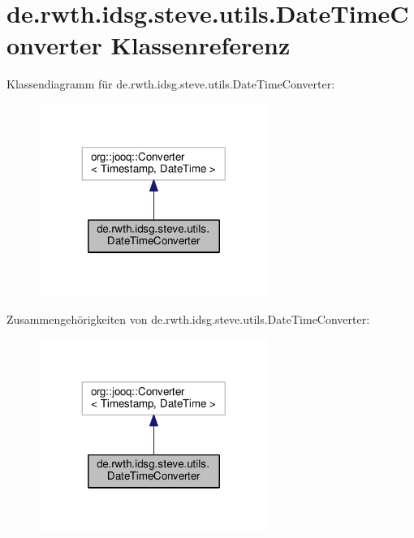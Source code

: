 \hypertarget{classde_1_1rwth_1_1idsg_1_1steve_1_1utils_1_1_date_time_converter}{\section{de.\+rwth.\+idsg.\+steve.\+utils.\+Date\+Time\+Converter Klassenreferenz}
\label{classde_1_1rwth_1_1idsg_1_1steve_1_1utils_1_1_date_time_converter}
}


Klassendiagramm für de.\+rwth.\+idsg.\+steve.\+utils.\+Date\+Time\+Converter\+:\nopagebreak
\begin{figure}[H]
\begin{center}
\leavevmode
\includegraphics[width=212pt]{classde_1_1rwth_1_1idsg_1_1steve_1_1utils_1_1_date_time_converter__inherit__graph}
\end{center}
\end{figure}


Zusammengehörigkeiten von de.\+rwth.\+idsg.\+steve.\+utils.\+Date\+Time\+Converter\+:\nopagebreak
\begin{figure}[H]
\begin{center}
\leavevmode
\includegraphics[width=212pt]{classde_1_1rwth_1_1idsg_1_1steve_1_1utils_1_1_date_time_converter__coll__graph}
\end{center}
\end{figure}
